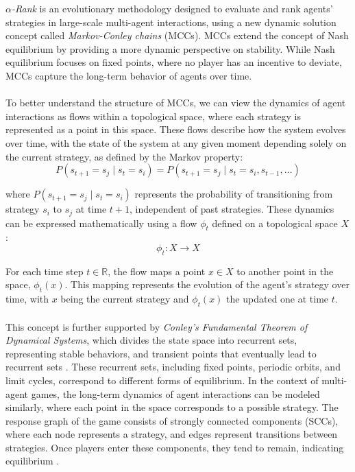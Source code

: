 \begin{flushleft}
    \begin{flushleft}

        \emph{$\alpha$-Rank} is an evolutionary methodology designed to evaluate and rank agents' strategies in large-scale multi-agent interactions, using a new dynamic solution concept called \emph{Markov-Conley chains} (MCCs). MCCs extend the concept of Nash equilibrium by providing a more dynamic perspective on stability. While Nash equilibrium focuses on fixed points, where no player has an incentive to deviate, MCCs capture the long-term behavior of agents over time.\\~\\
        
        To better understand the structure of MCCs, we can view the dynamics of agent interactions as flows within a topological space, where each strategy is represented as a point in this space. These flows describe how the system evolves over time, with the state of the system at any given moment depending solely on the current strategy, as defined by the Markov property:
        \begin{equation}
            P(s_{t+1} = s_j \mid s_t = s_i) = P(s_{t+1} = s_j \mid s_t = s_i, s_{t-1}, \dots)
            \label{eq:markov_property}
        \end{equation}
        
        where $P(s_{t+1} = s_j \mid s_t = s_i)$ represents the probability of transitioning from strategy $s_i$ to $s_j$ at time $t+1$, independent of past strategies. These dynamics can be expressed mathematically using a flow $\phi_t$ defined on a topological space $X$:
        \begin{equation}
            \phi_t: X \rightarrow X
            \label{eq:flow_phi}
        \end{equation}

        For each time step $t \in \mathbb{R}$, the flow maps a point $x \in X$ to another point in the space, $\phi_t(x)$. This mapping represents the evolution of the agent’s strategy over time, with $x$ being the current strategy and $\phi_t(x)$ the updated one at time $t$.\\~\\
        
        This concept is further supported by \emph{Conley's Fundamental Theorem of Dynamical Systems}, which divides the state space into recurrent sets, representing stable behaviors, and transient points that eventually lead to recurrent sets \cite{conley1978isolated}\cite{Norton1995}. These recurrent sets, including fixed points, periodic orbits, and limit cycles, correspond to different forms of equilibrium. In the context of multi-agent games, the long-term dynamics of agent interactions can be modeled similarly, where each point in the space corresponds to a possible strategy. The response graph of the game consists of strongly connected components (SCCs), where each node represents a strategy, and edges represent transitions between strategies. Once players enter these components, they tend to remain, indicating equilibrium \cite{omidshafiei2019alpharank}.
        

\end{flushleft}
\end{flushleft}

